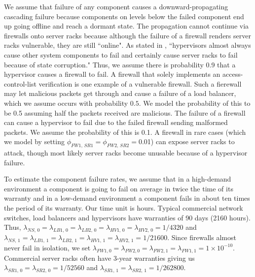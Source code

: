 \documentclass[12pt]{article}
\begin{document}
We assume that failure of any component causes a downward-propagating
cascading failure because components on levels below the failed component end
up going offline and reach a dormant state. The propagation cannot continue
via firewalls onto server racks because although the failure of a firewall
renders server racks vulnerable, they are still ``online". \iffalse To comply
with our model, dormancy is treated as a failure. We define the public
internet to be at $depth$ 0, the network switch to be at $depth = 1$ and so
on. Thus for the downward-propagating cascading failure, $\phi_{i, \, j} = 1$
satisfying $i, j \in \Omega, \; depth(j) = depth(i) + 1$ where $i$ and $j$ are
on the same side. \fi As stated in \cite{ReHype:2011}, ``hypervisors almost
always cause other system components to fail and certainly cause server racks
to fail because of state corruption." Thus, we assume there is probability 0.9
that a hypervisor causes a firewall to fail. A firewall that solely implements
an access-control-list verification is one example of a vulnerable firewall.
Such a fierewall may let malicious packets get through and cause a failure of
a load balancer, which we assume occurs with probability $0.5$. We model the
probability of this to be 0.5 assuming half the packets received are
malicious. The failure of a firewall can cause a hypervisor to fail due to the
failed firewall sending malformed packets. We assume the probability of this is
0.1. A firewall in rare cases (which we model by setting $\phi_{FW1, \, SR1} =
\phi_{FW2, \, SR2} = 0$.01) can expose server racks to attack, though most
likely server racks become unusable because of a hypervisor failure. 

To estimate the component failure rates, we assume that in a high-demand
environment a component is going to fail on average in twice the time of its
warranty and in a low-demand environment a component fails in about ten times
the period of its warranty. Our time unit is hours. Typical
commercial network switches, load balancers and hypervisors have warranties of
90 days (2160 hours). Thus, $\lambda_{NS, \, 0} = \lambda_{LB1, \, 0} =
\lambda_{LB2, \, 0} = \lambda_{HV1, \, 0} = \lambda_{HV2, \, 0} =
1 / 4320$ and $\lambda_{NS, \, 1} = \lambda_{LB1, \, 1} = \lambda_{LB2,
\, 1} = \lambda_{HV1, \, 1} = \lambda_{HV2, \, 1} = 1 / 21600$. Since
firewalls almost never fail in isolation, we set $\lambda_{FW1, 0} =
\lambda_{FW2, 0} = \lambda_{FW2, 1} = \lambda_{FW1, 1} = 1 \times 10^{-10}$.
Commercial server racks often have 3-year warranties giving us $\lambda_{SR1,
\, 0} = \lambda_{SR2, \, 0} = 1 / 52560$ and $\lambda_{SR1, \, 1} =
\lambda_{SR2, \, 1} = 1 / 262800$. 
\end{document}
